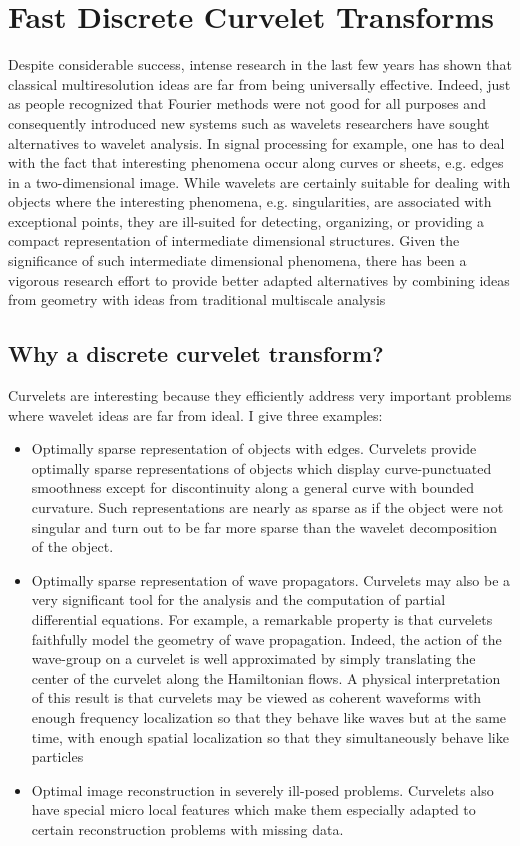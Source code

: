 \section{Fast Discrete Curvelet Transforms}
Despite considerable success, intense research in the last few years has shown that classical multiresolution ideas are far from being universally effective. Indeed, just as people recognized that
Fourier methods were not good for all purposes and consequently introduced new systems such as wavelets researchers have sought alternatives to wavelet analysis. In signal processing for example, one has to deal with the fact that interesting phenomena occur along curves or sheets, e.g.
edges in a two-dimensional image. While wavelets are certainly suitable for dealing with objects where the interesting phenomena, e.g. singularities, are associated with exceptional points, they
are ill-suited for detecting, organizing, or providing a compact representation of intermediate dimensional structures. Given the significance of such intermediate dimensional phenomena, there
has been a vigorous research effort to provide better adapted alternatives by combining ideas from geometry with ideas from traditional multiscale analysis 
\subsection{Why a discrete curvelet transform?}
Curvelets are interesting because they efficiently address very important problems where wavelet ideas are far from ideal. I give three examples:

\begin{itemize}
  \item Optimally sparse representation of objects with edges. Curvelets provide optimally sparse representations of objects which display curve-punctuated smoothness except for discontinuity along a general curve with bounded curvature. Such representations are nearly as sparse as if the object were not singular and turn out to be far more sparse than
the wavelet decomposition of the object.
  \item Optimally sparse representation of wave propagators. Curvelets may also be a very significant tool for the analysis and the computation of partial differential equations. For example, a remarkable property is that curvelets faithfully model the geometry of wave propagation. Indeed, the action of the wave-group on a curvelet is well approximated by simply translating the center of the curvelet along the Hamiltonian flows. A physical interpretation of this result is that curvelets may be viewed as coherent waveforms with enough frequency localization so that they behave like waves but at the same time, with enough spatial localization so that
they simultaneously behave like particles 
  \item Optimal image reconstruction in severely ill-posed problems. Curvelets also have special micro local features which make them especially adapted to certain reconstruction problems with missing data.
\end{itemize}

